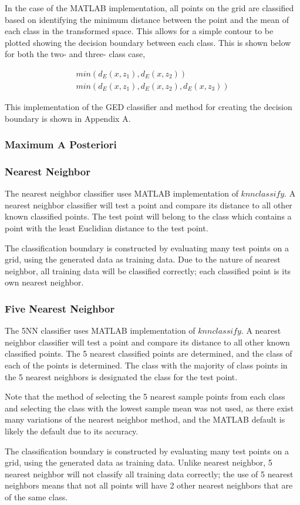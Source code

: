 In the case of the MATLAB implementation, all points on the grid are classified based on identifying the minimum distance between the point and the mean of each class in the transformed space. This allows for a simple contour to be plotted showing the decision boundary between each class. This is shown below for both the two- and three- class case,

\begin{eqnarray}
\label{eqn:pointClass-GED}
min(d_{E} (x,z_{1}), d_{E} (x,z_{2})) \\
min(d_{E} (x,z_{1}), d_{E} (x,z_{2}), d_{E} (x,z_{3}))
\end{eqnarray}


This implementation of the GED classifier and method for creating the decision boundary is shown in Appendix A.

\subsubsection{Maximum A Posteriori}

\subsubsection{Nearest Neighbor}

The nearest neighbor classifier uses MATLAB implementation of $knnclassify$. A nearest neighbor classifier will test a point and compare its distance to all other known classified points. The test point will belong to the class which contains a point with the least Euclidian distance to the test point.

The classification boundary is constructed by evaluating many test points on a grid, using the generated data as training data. Due to the nature of nearest neighbor, all training data will be classified correctly; each classified point is its own nearest neighbor.

\subsubsection{Five Nearest Neighbor}

The 5NN classifier uses MATLAB implementation of $knnclassify$. A nearest neighbor classifier will test a point and compare its distance to all other known classified points. The 5 nearest classified points are determined, and the class of each of the points is determined. The class with the majority of class points in the 5 nearest neighbors is designated the class for the test point.

Note that the method of selecting the 5 nearest sample points from each class and selecting the class with the lowest sample mean was not used, as there exist many variations of the nearest neighbor method, and the MATLAB default is likely the default due to its accuracy.

The classification boundary is constructed by evaluating many test points on a grid, using the generated data as training data. Unlike nearest neighbor, 5 nearest neighbor will not classify all training data correctly; the use of 5 nearest neighbors means that not all points will have 2 other nearest neighbors that are of the same class.
